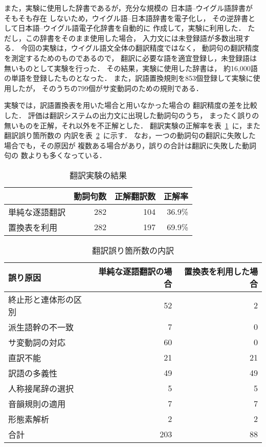 また，実験に使用した辞書であるが，充分な規模の
日本語--ウイグル語辞書が
そもそも存在
しないため，ウイグル語--日本語辞書\cite{IINUMA}を電子化し，
その逆辞書として日本語--ウイグル語電子化辞書を自動的に
作成して\cite{OGAWA_dic}，実験に利用した．
ただし，この辞書をそのまま使用した場合，
入力文には未登録語が多数出現する．
今回の実験は，ウイグル語文全体の翻訳精度ではなく，
動詞句の翻訳精度を測定するためのものであるので，
翻訳に必要な語を適宜登録し，未登録語は無いものとして実験を行った．
その結果，実験に使用した辞書は，
約16,000語の単語を登録したものとなった．
また，訳語置換規則を853個登録して実験に使用したが，
そのうちの799個がサ変動詞のための規則である．

実験では，訳語置換表を用いた場合と用いなかった場合の
翻訳精度の差を比較した．
評価は翻訳システムの出力文に出現した動詞句のうち，
まったく誤りの無いものを正解，それ以外を不正解とした．
翻訳実験の正解率を表~\ref{translation}~に，また翻訳誤り箇所数の
内訳を表~\ref{miss_translation}~に示す．
なお，一つの動詞句の翻訳に失敗した場合でも，その原因が
複数ある場合があり，誤りの合計は翻訳に失敗した動詞句の
数よりも多くなっている．

\begin{table}[tbp]
\caption{翻訳実験の結果}
\label{translation}
\begin{center}
\begin{tabular}{l|r|r|r}
\hline
\hline
 & 動詞句数 & 正解翻訳数 & 正解率\\
\hline
単純な逐語翻訳 & 282 & 104 & 36.9\%\\
置換表を利用 & 282 & 197 & 69.9\%\\
\hline
\end{tabular}
\end{center}
\end{table}

\begin{table}[tbp]
\vspace{-4mm}
\caption{翻訳誤り箇所数の内訳}
\label{miss_translation}
\begin{center}
\begin{tabular}{l|r|r}
\hline
\hline
誤り原因& 単純な逐語翻訳の場合  & 置換表を利用した場合  \\
\hline
終止形と連体形の区別 & 52&2\\
派生語幹の不一致 & 7& 0\\
サ変動詞の対応 & 60& 0\\
直訳不能 & 21& 21\\
訳語の多義性 &49 & 49\\
人称接尾辞の選択 & 5& 5\\
音韻規則の適用& 7& 7\\
形態素解析 & 2 & 2\\
\hline
合計 & 203& 88\\
\hline
\end{tabular}
\end{center}
\end{table}

